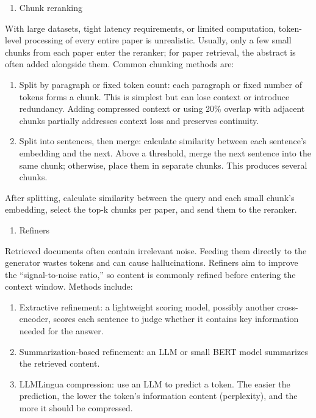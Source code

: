 \begin{enumerate}
\def\labelenumi{\arabic{enumi}.}
\setcounter{enumi}{1}
\tightlist
\item
  Chunk reranking
\end{enumerate}

With large datasets, tight latency requirements, or limited computation, token-level processing of every entire paper is unrealistic. Usually, only a few small chunks from each paper enter the reranker; for paper retrieval, the abstract is often added alongside them. Common chunking methods are:

\begin{enumerate}
\def\labelenumi{(\arabic{enumi})}
\item
  Split by paragraph or fixed token count: each paragraph or fixed number of tokens forms a chunk. This is simplest but can lose context or introduce redundancy. Adding compressed context or using 20\% overlap with adjacent chunks partially addresses context loss and preserves continuity.
\item
  Split into sentences, then merge: calculate similarity between each sentence's embedding and the next. Above a threshold, merge the next sentence into the same chunk; otherwise, place them in separate chunks. This produces several chunks.
\end{enumerate}

After splitting, calculate similarity between the query and each small chunk's embedding, select the top-k chunks per paper, and send them to the reranker.

\begin{enumerate}
\def\labelenumi{(\Roman{enumi})}
\setcounter{enumi}{1}
\tightlist
\item
  Refiners
\end{enumerate}

Retrieved documents often contain irrelevant noise. Feeding them directly to the generator wastes tokens and can cause hallucinations. Refiners aim to improve the ``signal-to-noise ratio,'' so content is commonly refined before entering the context window. Methods include:

\begin{enumerate}
\def\labelenumi{\arabic{enumi}.}
\item
  Extractive refinement: a lightweight scoring model, possibly another cross-encoder, scores each sentence to judge whether it contains key information needed for the answer.
\item
  Summarization-based refinement: an LLM or small BERT model summarizes the retrieved content.
\item
  LLMLingua compression: use an LLM to predict a token. The easier the prediction, the lower the token's information content (perplexity), and the more it should be compressed.
\end{enumerate}

